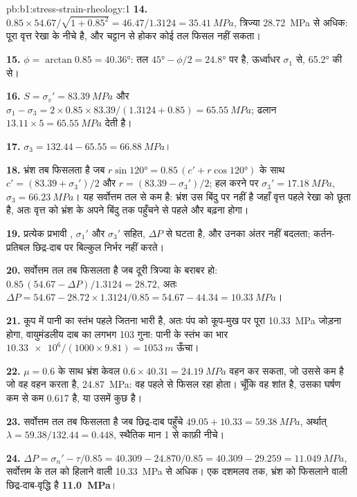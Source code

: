\begin{solution}{pb:b1:stress-strain-rheology:1}
\textbf{14.} $0.85\times54.67/\sqrt{1 + 0.85^2} = 46.47/1.3124 =
\qty{35.41}{MPa}$, त्रिज्या \qty{28.72}{MPa} से अधिक: पूरा वृत्त रेखा के नीचे है, और चट्टान से होकर कोई तल फिसल नहीं सकता।

\textbf{15.} $\phi = \arctan0.85 = \ang{40.36}$: तल $\ang{45} - \phi/2 = \ang{24.8}$ पर है, ऊर्ध्वाधर $\sigma_1$ से, \ang{65.2} की  से।

\textbf{16.} $S = \sigma_v' = \qty{83.39}{MPa}$ और
$\sigma_1 - \sigma_3 = 2\times0.85\times83.39/(1.3124 + 0.85) =
\qty{65.55}{MPa}$; ढलान $13.11\times5 = \qty{65.55}{MPa}$ देती है।

\textbf{17.} $\sigma_3 = 132.44 - 65.55 = \qty{66.88}{MPa}$।

\textbf{18.} भ्रंश तब फिसलता है जब
$r\sin\ang{120} = 0.85\,(c' + r\cos\ang{120})$ के साथ
$c' = (83.39 + \sigma_3')/2$ और $r = (83.39 - \sigma_3')/2$; हल करने पर
$\sigma_3' = \qty{17.18}{MPa}$, $\sigma_3 = \qty{66.23}{MPa}$। यह सर्वोत्तम तल से कम है: भ्रंश उस बिंदु पर नहीं है जहाँ वृत्त पहले रेखा को छूता है, अतः वृत्त को भ्रंश के अपने बिंदु तक पहुँचने से पहले और बढ़ना होगा।

\textbf{19.} प्रत्येक प्रभावी , $\sigma_1'$ और $\sigma_3'$ सहित, $\Delta P$ से घटता है, और उनका अंतर नहीं बदलता; कर्तन-प्रतिबल छिद्र-दाब पर बिल्कुल निर्भर नहीं करते।

\textbf{20.} सर्वोत्तम तल तब फिसलता है जब दूरी त्रिज्या के बराबर हो:
$0.85\,(54.67 - \Delta P)/1.3124 = 28.72$, अतः
$\Delta P = 54.67 - 28.72\times1.3124/0.85 = 54.67 - 44.34 = \qty{10.33}{MPa}$।

\textbf{21.} कूप में पानी का स्तंभ पहले जितना भारी है, अतः पंप को कूप-मुख पर पूरा \qty{10.33}{MPa} जोड़ना होगा, वायुमंडलीय दाब का लगभग 103 गुना:
पानी के स्तंभ का भार $\num{10.33e6}/(1000\times9.81) = \qty{1053}{m}$ ऊँचा।

\textbf{22.} $\mu = 0.6$ के साथ भ्रंश केवल
$0.6\times40.31 = \qty{24.19}{MPa}$ वहन कर सकता, जो उससे कम है जो वह वहन करता है, \qty{24.87}{MPa}: वह पहले से फिसल रहा होता। चूँकि वह शांत है, उसका घर्षण कम से कम $0.617$ है, या उसमें कुछ  है।

\textbf{23.} सर्वोत्तम तल तब फिसलता है जब छिद्र-दाब पहुँचे $49.05 + 10.33 = \qty{59.38}{MPa}$, अर्थात् $\lambda = 59.38/132.44 = 0.448$, स्थैतिक मान 1 से काफ़ी नीचे।

\textbf{24.} $\Delta P = \sigma_n' - \tau/0.85 = 40.309 - 24.870/0.85 = 40.309 -
29.259 = \qty{11.049}{MPa}$, सर्वोत्तम  के तल को हिलाने वाली \qty{10.33}{MPa} से अधिक। एक दशमलव तक, भ्रंश को फिसलाने वाली छिद्र-दाब-वृद्धि है
\textbf{\qty[text-series-to-math=true]{11.0}{MPa}}।
\end{solution}
